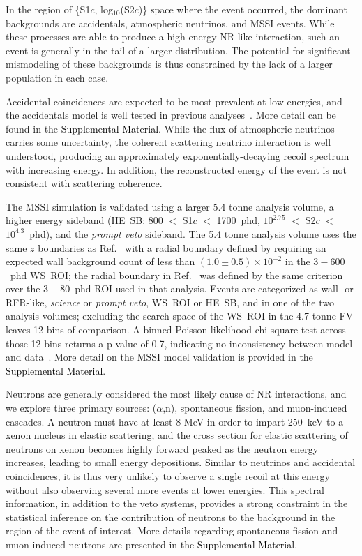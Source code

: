 In the region of \{S1$c$, log$_{10}$(S2$c$)\} space where the event occurred, the dominant backgrounds are accidentals, atmospheric neutrinos, and MSSI events. 
While these processes are able to produce a high energy NR-like interaction, such an event is generally in the tail of a larger distribution. 
The potential for significant mismodeling of these backgrounds is thus constrained by the lack of a larger population in each case. 




Accidental coincidences are expected to be most prevalent at low energies,
and the accidentals model is well tested in previous analyses~\cite{LZ:SR3_WS2024, LZ:2025lowmass}. More detail can be found in the \textcolor{black}{Supplemental Material}.
While the flux of atmospheric neutrinos carries some uncertainty, the coherent scattering neutrino interaction is well understood, producing an approximately exponentially-decaying recoil spectrum with increasing energy.
In addition, the reconstructed energy of the event is not consistent with scattering coherence.

The MSSI simulation is validated using a larger 5.4 tonne analysis volume, a higher energy sideband (HE~SB: 800 $<$ S1$c$ $<$ 1700~phd, $10^{2.75}$ $<$ S2$c$ $<$ $10^{4.3}$~phd), and the \emph{prompt veto} sideband. The 5.4 tonne analysis volume uses the same $z$ boundaries as Ref.~\cite{LZ:SR3_WS2024} with a radial boundary defined by requiring an expected wall background count of less than $(1.0 \pm 0.5)\times10^{-2}$ in the $3-600$~phd WS~ROI; the radial boundary in Ref.~\cite{LZ:SR3_WS2024} was defined by the same criterion over the $3-80$~phd ROI used in that analysis. 
Events are categorized as wall- or RFR-like, \emph{science} or \emph{prompt veto}, WS~ROI or HE~SB, and in one of the two analysis volumes; excluding the search space of the WS~ROI in the 4.7 tonne FV leaves 12 bins of comparison. 
A binned Poisson likelihood chi-square test across those 12 bins returns a p-value of 0.7, indicating no inconsistency between model and data~\cite{BAKER1984437}.
More detail on the MSSI model validation is provided in the \textcolor{black}{Supplemental Material}.

Neutrons are generally considered the most likely cause of NR interactions, and we explore three primary sources: ($\alpha$,n), spontaneous fission, and muon-induced cascades. 
A neutron must have at least 8 MeV in order to impart 250~keV to a xenon nucleus in elastic scattering, and the cross section for elastic scattering of neutrons on xenon becomes highly forward peaked as the neutron energy increases, leading to small energy depositions. 
Similar to neutrinos and accidental coincidences, it is thus very unlikely to observe a single  recoil at this energy without also observing several more events at lower energies.
This spectral information, in addition to the veto systems, provides a strong constraint in the statistical inference on the contribution of neutrons to the background in the region of the event of interest. 
More details regarding 
spontaneous fission and muon-induced 
neutrons are presented in the \textcolor{black}{Supplemental Material}.




